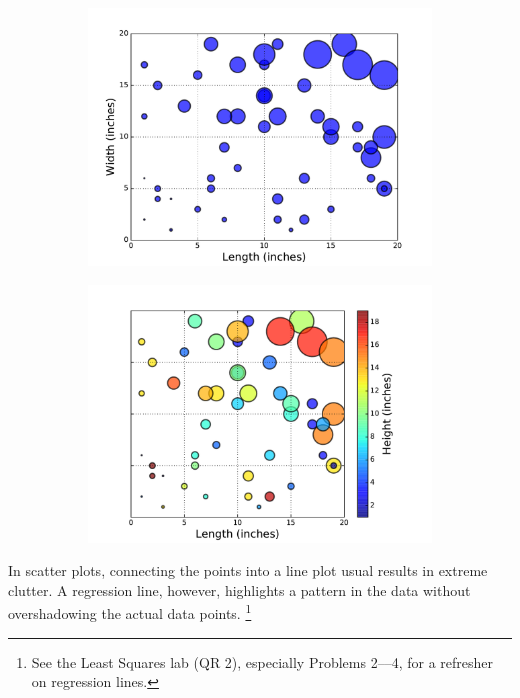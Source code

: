 \begin{figure}[H]
\begin{subfigure}{.495\textwidth}
    \includegraphics[width=\linewidth]{figures/scatter_3.pdf}
\end{subfigure}
%
\begin{subfigure}{.495\textwidth}
    \centering
    \includegraphics[width=\linewidth]{figures/scatter_4.pdf}
\end{subfigure}
\end{figure}

In scatter plots, connecting the points into a line plot usual results in extreme clutter.
A regression line, however, highlights a pattern in the data without overshadowing the actual data points.%
\footnote{See the Least Squares lab (QR 2), especially Problems 2–--4, for a refresher on regression lines.}

